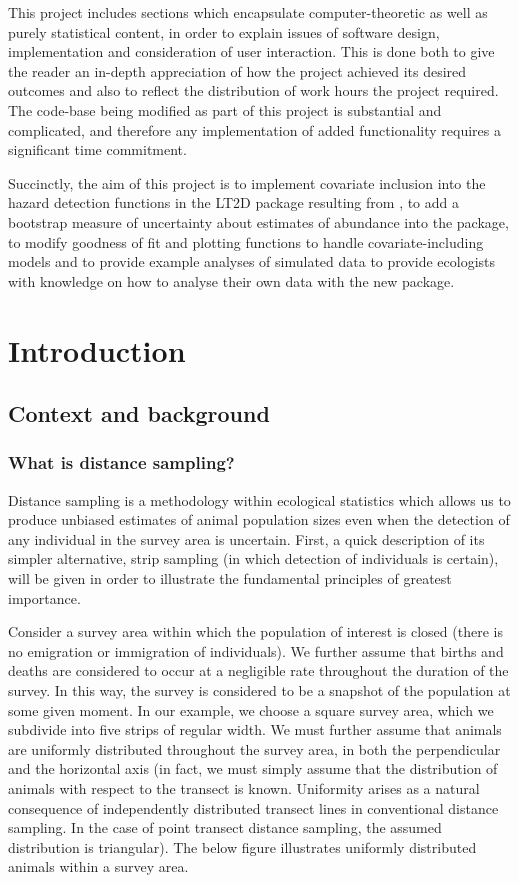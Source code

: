 \documentclass[11pt]{article}
\begin{document}
\begin{multicols}{2}
This project includes sections which encapsulate computer-theoretic as well as purely statistical content, in order to explain issues of software design, implementation and consideration of user interaction. This is done both to give the reader an in-depth appreciation of how the project achieved its desired outcomes and also to reflect the distribution of work hours the project required. The code-base being modified as part of this project is substantial and complicated, and therefore any implementation of added functionality requires a significant time commitment.

Succinctly, the aim of this project is to implement covariate inclusion into the hazard detection functions in the LT2D package resulting from \cite{Borchers}, to add a bootstrap measure of uncertainty about estimates of abundance into the package, to modify goodness of fit and plotting functions to handle covariate-including models and to provide example analyses of simulated data to provide ecologists with knowledge on how to analyse their own data with the new package.

\section{Introduction}
\subsection{Context and background}


\subsubsection{What is distance sampling?}

Distance sampling is a methodology within ecological statistics which allows us to produce unbiased estimates of animal population sizes even when the detection of any individual in the survey area is uncertain. First, a quick description of its simpler alternative, strip sampling (in which detection of individuals is certain), will be given in order to illustrate the fundamental principles of greatest importance. 

Consider a survey area within which the population of interest is closed (there is no emigration or immigration of individuals). We further assume that births and deaths are considered to occur at a negligible rate throughout the duration of the survey. In this way, the survey is considered to be a snapshot of the population at some given moment. In our example, we choose a square survey area, which we subdivide into five strips of regular width. We must further assume that animals are uniformly distributed throughout the survey area, in both the perpendicular and the horizontal axis (in fact, we must simply assume that the distribution of animals with respect to the transect is known. Uniformity arises as a natural consequence of independently distributed transect lines in conventional distance sampling. In the case of point transect distance sampling, the assumed distribution is triangular). The below figure illustrates uniformly distributed animals within a survey area.


\end{multicols}
\end{document}
